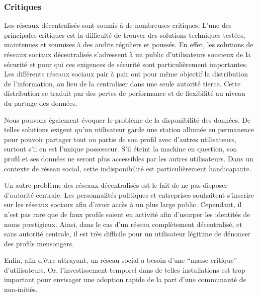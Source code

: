 \subsubsection{Critiques}

Les réseaux décentralisés sont soumis à de nombreuses critiques.  L'une des
principales critiques est la difficulté de trouver des solutions techniques
testées, maintenues et soumises à des audits réguliers et poussés.  En effet,
les solutions de réseaux sociaux décentralisés s'adressent à un public
d'utilisateurs soucieux de la sécurité et pour qui ces exigences de sécurité
sont particulièrement importantes. Les différents
réseaux sociaux pair à pair ont pour même objectif la distribution de
l’information, au lieu de la centraliser dans une seule autorité tierce.  Cette
distribution se traduit par des pertes de performance et de flexibilité au
niveau du partage des données.

Nous pouvons également évoquer le problème de la disponibilité des données. De
telles solutions exigent qu'un utilisateur garde une station allumée en
permanence pour pouvoir partager tout ou partie de son profil avec d'autres
utilisateurs, surtout s'il en est l'unique possesseur.  S'il éteint la machine
en question, son profil et ses données ne seront plus accessibles par les
autres utilisateurs. Dans un contexte de réseau social, cette indisponibilité
est particulièrement handicapante.

Un autre problème des réseaux décentralisés est le fait de ne pas disposer
d'autorité centrale. Les personnalités politiques et entreprises souhaitent
s'inscrire sur les réseaux sociaux afin d'avoir accès à un plus large public.
Cependant, il n'est pas rare que de faux profils soient en activité afin
d'usurper les identités de noms prestigieux. Ainsi, dans le cas d'un réseau
complètement décentralisé, et sans autorité centrale, il est très difficile pour
un utilisateur légitime de dénoncer des profils mensongers.

Enfin, afin d'être attrayant, un réseau social a besoin d'une ``masse
critique'' d'utilisateurs. Or, l'investissement temporel dans de telles
installations est trop important pour envisager une adoption rapide de la part
d'une communauté de non-initiés.
